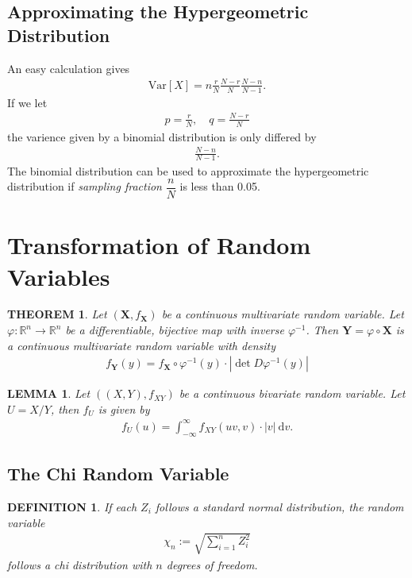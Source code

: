 \documentclass[11pt,a4paper]{article}
\newcommand{\dd}{\mathrm{d}}
\newcommand{\XX}{\mathbf{X}}
\newcommand{\YY}{\mathbf{Y}}
\newtheorem*{theorem}{\bf THEOREM}
\newtheorem*{lemma}{\bf LEMMA}
\newtheorem*{definition}{\bf DEFINITION}
\begin{document}
\subsection{Approximating the Hypergeometric Distribution}
An easy calculation gives
\begin{gather*}
    \mathrm{Var}[X]=n\frac{r}{N}\frac{N-r}{N}\frac{N-n}{N-1}.
\end{gather*}
If we let
\begin{gather*}
    p=\frac{r}{N},\quad q=\frac{N-r}{N}
\end{gather*}
the varience given by a binomial distribution is only differed by
\begin{gather*}
    \frac{N-n}{N-1}.
\end{gather*}
The binomial distribution can be used to approximate the hypergeometric distribution
if {\it sampling fraction} $\dfrac{n}{N}$ is less than 0.05.


\section{Transformation of Random Variables}
\begin{theorem}
    Let $(\XX,f_{\XX})$ be a continuous multivariate random variable.
    Let $\varphi:\mathbb{R}^n\rightarrow\mathbb{R}^n$
    be a differentiable, bijective map with inverse $\varphi^{-1}$.
    Then $\YY=\varphi\circ\XX$ is a continuous multivariate random variable with
    density
    \begin{gather*}
        f_\YY(y)=f_\XX\circ\varphi^{-1}(y)\cdot\left\lvert \det D\varphi^{-1}(y)\right\rvert     \end{gather*}
\end{theorem}
\begin{lemma}
    Let $((X,Y),f_{XY})$ be a continuous bivariate random variable.
    Let $U=X/Y$, then $f_U$ is given by
    \begin{gather*}
        f_U(u)=\int_{-\infty}^{\infty}f_{XY}(uv,v)\cdot \left\lvert v\right\rvert \ \dd v.
    \end{gather*}
\end{lemma}

\subsection{The Chi Random Variable}

\begin{definition}
    If each $Z_i$ follows a standard normal distribution, the random variable
    \begin{gather*}
        \chi_n:=\sqrt{\sum_{i=1}^{n}Z_i^2}
    \end{gather*}
    follows a chi distribution with $n$ degrees of freedom.
\end{definition}
\end{document}
